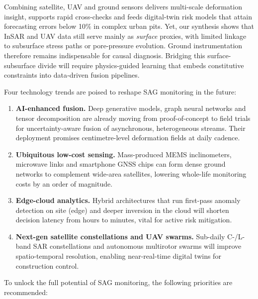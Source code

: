 \documentclass[preprint,11pt,authoryear,3p]{elsarticle}
\begin{document}
Combining satellite, UAV and ground sensors delivers multi-scale deformation insight, supports rapid cross-checks and feeds digital-twin risk models that attain forecasting errors below 10\% in complex urban pits. Yet, our synthesis shows that InSAR and UAV data still serve mainly as \emph{surface} proxies, with limited linkage to subsurface stress paths or pore-pressure evolution.  Ground instrumentation therefore remains indispensable for causal diagnosis.  Bridging this surface-subsurface divide will require physics-guided learning that embeds constitutive constraints into data‐driven fusion pipelines.

Four technology trends are poised to reshape SAG monitoring in the future:

\begin{enumerate}
    \item \textbf{AI-enhanced fusion.}  Deep generative models, graph neural networks and tensor decomposition are already moving from proof-of-concept to field trials for uncertainty-aware fusion of asynchronous, heterogeneous streams.  Their deployment promises centimetre-level deformation fields at daily cadence.
    \item \textbf{Ubiquitous low-cost sensing.}  Mass-produced MEMS inclinometers, microwave links and smartphone GNSS chips can form dense ground networks to complement wide-area satellites, lowering whole-life monitoring costs by an order of magnitude.
    \item \textbf{Edge-cloud analytics.}  Hybrid architectures that run first-pass anomaly detection on site (edge) and deeper inversion in the cloud will shorten decision latency from hours to minutes, vital for active risk mitigation.
    \item \textbf{Next-gen satellite constellations and UAV swarms.}  Sub-daily C-/L-band SAR constellations and autonomous multirotor swarms will improve spatio-temporal resolution, enabling near-real-time digital twins for construction control.
\end{enumerate}

To unlock the full potential of SAG monitoring, the following priorities are recommended:
\end{document}
